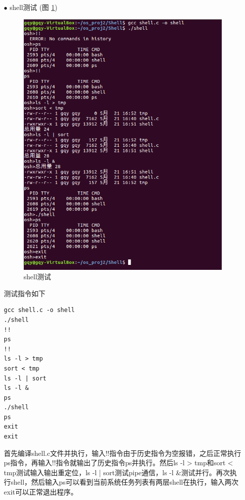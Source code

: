 \documentclass{article}
\begin{document}
\begin{itemize}
\item[$\bullet$]shell测试 (图 \ref{shell测试})\\
\begin{figure}[htbp]%
		\centering%
		\includegraphics{shell}
		\caption{shell测试} \label{shell测试}%
\end{figure}


测试指令如下
\begin{lstlisting}[language={[ANSI]C}]
gcc shell.c -o shell
./shell
!!
ps
!!
ls -l > tmp
sort < tmp
ls -l | sort
ls -l &
ps
./shell
ps
exit
exit
\end{lstlisting}
首先编译shell.c文件并执行，输入!!指令由于历史指令为空报错，之后正常执行ps指令，再输入!!指令就输出了历史指令ps并执行。然后ls -l > tmp和sort < tmp测试输入输出重定位，ls -l | sort测试pipe通信，ls -l \&测试并行。再次执行shell，然后输入ps可以看到当前系统任务列表有两层shell在执行，输入两次exit可以正常退出程序。
\end{itemize}
\end{document}
